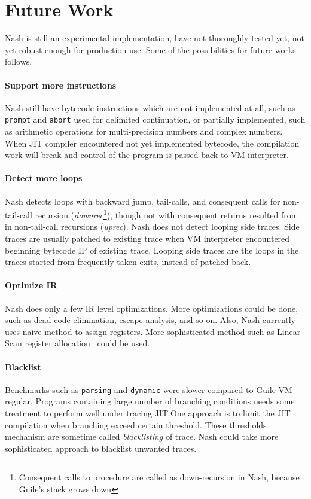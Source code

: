 \documentclass[preprint, 10pt]{sigplanconf}
\begin{document}
\section{Future Work}
\label{sec:future}

Nash is still an experimental implementation, have not thoroughly tested yet,
not yet robust enough for production use. Some of the possibilities for future
works follows.

\paragraph{Support more instructions} Nash still have bytecode
instructions which are not implemented at all, such as \texttt{prompt} and
\texttt{abort} used for delimited continuation, or partially implemented, such
as arithmetic operations for multi-precision numbers and complex numbers. When
JIT compiler encountered not yet implemented bytecode, the compilation work will
break and control of the program is passed back to VM interpreter.

\paragraph{Detect more loops} Nash detects loops with backward jump,
tail-calls, and consequent calls for non-tail-call recursion
(\textit{downrec}\footnote{Consequent calls to procedure are called as
  down-recursion in Nash, because Guile's stack grows down}), though not with
consequent returns resulted from in non-tail-call recursions
(\textit{uprec}). Nash does not detect looping side traces. Side traces are
usually patched to existing trace when VM interpreter encountered beginning
bytecode IP of existing trace. Looping side traces are the loops in the traces
started from frequently taken exits, instead of patched back.

\paragraph{Optimize IR} Nash does only a few IR level optimizations.
More optimizations could be done, such as dead-code elimination, escape
analysis, and so on. Also, Nash currently uses naive method to assign
registers. More sophisticated method such as Linear-Scan register
allocation~\cite{poletto1999linear} could be used.

\paragraph{Blacklist} Benchmarks such as \texttt{parsing} and
\texttt{dynamic} were slower compared to Guile VM-regular. Programs containing
large number of branching conditions needs some treatment to perform well
under tracing JIT.\@ One approach is to limit the JIT compilation when
branching exceed certain threshold. These thresholds mechanism are sometime
called \textit{blacklisting} of trace. Nash could take more sophisticated
approach to blacklist unwanted traces.
\end{document}

